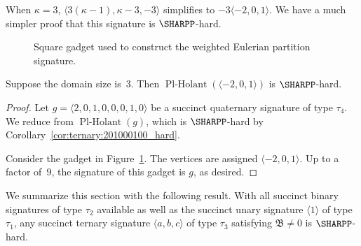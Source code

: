 \documentclass[11pt]{article}
\newcommand{\PlHolant}{\operatorname{Pl-Holant}}
\def\borderColor{blue!60}
\def\scale{0.6}
\def\nodeDist{1.4cm}
\begin{document}
When $\kappa = 3$,
$\langle 3 (\kappa - 1), \kappa - 3, -3 \rangle$ simplifies to $-3 \langle -2,0,1 \rangle$.
We have a much simpler proof that this signature is $\SHARPP$-hard.

\begin{figure}[t]
 \centering
 \caption{Square gadget used to construct the weighted Eulerian partition signature.}
 \label{fig:gadget:ternary:square}
\end{figure}

\begin{lemma} \label{lem:ternary:-201}
 Suppose the domain size is~$3$.
 Then $\PlHolant(\langle -2,0,1 \rangle)$ is $\SHARPP$-hard.
\end{lemma}

\begin{proof}
 Let $g = \langle 2,0,1,0,0,0,1,0 \rangle$ be a succinct quaternary signature of type $\tau_4$.
 We reduce from $\PlHolant(g)$,
 which is $\SHARPP$-hard by Corollary~\ref{cor:ternary:201000100_hard}.

 Consider the gadget in Figure~\ref{fig:gadget:ternary:square}.
 The vertices are assigned $\langle -2,0,1 \rangle$.
 Up to a factor of~$9$,
 the signature of this gadget is $g$, as desired.
\end{proof}

We summarize this section with the following result.
With all succinct binary signatures of type $\tau_2$ available
as well as the succinct unary signature $\langle 1 \rangle$ of type $\tau_1$,
any succinct ternary signature $\langle a,b,c \rangle$ of type $\tau_3$ satisfying $\mathfrak{B} \ne 0$ is $\SHARPP$-hard.
\end{document}
